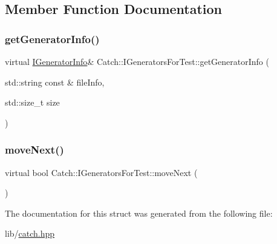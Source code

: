 \subsection{Member Function Documentation}
\hypertarget{struct_catch_1_1_i_generators_for_test_a180d84e858840188e4c3788e47eefdb0}{}\label{struct_catch_1_1_i_generators_for_test_a180d84e858840188e4c3788e47eefdb0} 
\subsubsection{\texorpdfstring{get\+Generator\+Info()}{getGeneratorInfo()}}
{\footnotesize\ttfamily virtual \hyperlink{struct_catch_1_1_i_generator_info}{I\+Generator\+Info}\& Catch\+::\+I\+Generators\+For\+Test\+::get\+Generator\+Info (\begin{DoxyParamCaption}\item[{std\+::string const \&}]{file\+Info,  }\item[{std\+::size\+\_\+t}]{size }\end{DoxyParamCaption})\hspace{0.3cm}{\ttfamily [pure virtual]}}

\hypertarget{struct_catch_1_1_i_generators_for_test_adab31832d529fc584fd63164e0a1c8ad}{}\label{struct_catch_1_1_i_generators_for_test_adab31832d529fc584fd63164e0a1c8ad} 
\subsubsection{\texorpdfstring{move\+Next()}{moveNext()}}
{\footnotesize\ttfamily virtual bool Catch\+::\+I\+Generators\+For\+Test\+::move\+Next (\begin{DoxyParamCaption}{ }\end{DoxyParamCaption})\hspace{0.3cm}{\ttfamily [pure virtual]}}



The documentation for this struct was generated from the following file\+:\begin{DoxyCompactItemize}
\item 
lib/\hyperlink{catch_8hpp}{catch.\+hpp}\end{DoxyCompactItemize}
